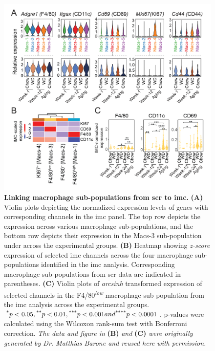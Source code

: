 \begin{figure}[t!]
\centering
\includegraphics[width=\linewidth]{Chapter4/Fig/F2-4-01.png}
\caption[Linking macrophage sub-populations from  to ]{\textbf{Linking macrophage sub-populations from \gls{scr} to \gls{imc}.} \textbf{(A)} Violin plots depicting the normalized expression levels of genes with corresponding channels in the \gls{imc} panel. The top row depicts the expression across various macrophage sub-populations, and the bottom row depicts their expression in the Macs-3 sub-population under across the experimental groups. \textbf{(B)} Heatmap showing \textit{z-score} expression of selected \gls{imc} channels across the four macrophage sub-populations identified in the \gls{imc} analysis. Corresponding macrophage sub-populations from \gls{scr} data are indicated in parentheses. \textbf{(C)} Violin plots of \textit{arcsinh} transformed expression of selected channels in the F4/80\textsuperscript{\textit{low}} macrophage sub-population from the \gls{imc} analysis across the experimental groups. $\textsuperscript{*} p < 0.05, \textsuperscript{**} p < 0.01, \textsuperscript{***} p < 0.001 and \textsuperscript{****} p < 0.0001$. p-values were calculated using the Wilcoxon rank-sum test with Bonferroni correction. \textit{The data and figure in } \textbf{(B)} \textit{and} \textbf{(C)} \textit{were originally generated by Dr. Matthias Barone and reused here with permission.}}
\label{fig:chp2_scrna_macrophages_imc}
\end{figure}




